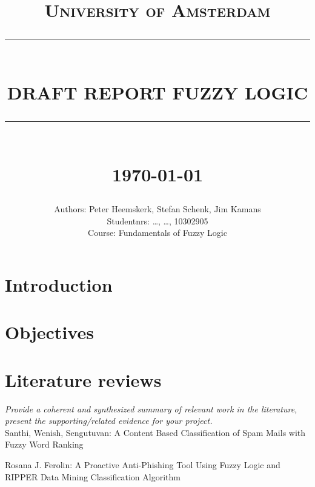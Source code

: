 \documentclass[a4paper]{article}
\newcommand{\HRule}[1]{\rule{\linewidth}{#1}}
\begin{document}
\title{ \normalsize \textsc{University of Amsterdam}
    \\ [2.0cm]
    \HRule{0.5pt} \\
    \LARGE \textbf{\uppercase{Draft Report Fuzzy Logic}}
    \HRule{2pt} \\ [0.5cm]
    \normalsize \today \vspace*{5\baselineskip}}

\date{}

\author{
    Authors: Peter Heemskerk, Stefan Schenk, Jim Kamans \\
    Studentnrs: \dots, \dots, 10302905 \\
        Course: Fundamentals of Fuzzy Logic}

\maketitle
\newpage

\tableofcontents
\newpage

\sectionfont{\scshape}

\section{Introduction}
\lipsum

\section{Objectives}
\lipsum

\section{Literature reviews}

\textit{Provide a coherent and synthesized summary of relevant work in the literature, present the supporting/related evidence for your project.} \\

Santhi, Wenish, Sengutuvan: A Content Based Classification of Spam Mails with Fuzzy Word Ranking

Rosana J. Ferolin: A Proactive Anti-Phishing Tool Using Fuzzy Logic and RIPPER Data Mining Classification Algorithm
\end{document}
